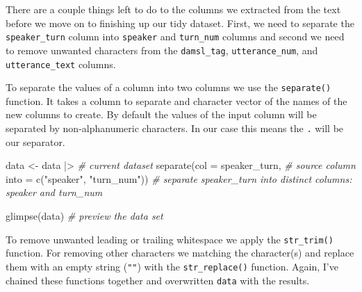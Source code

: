 \documentclass[
  letterpaper,
  DIV=11,
  numbers=noendperiod]{scrreport}
\newenvironment{Shaded}{\begin{snugshade}}{\end{snugshade}}
\newcommand{\AttributeTok}[1]{\textcolor[rgb]{0.00,0.00,0.00}{#1}}
\newcommand{\CommentTok}[1]{\textcolor[rgb]{0.00,0.00,0.00}{\textit{#1}}}
\newcommand{\FunctionTok}[1]{\textcolor[rgb]{0.00,0.00,0.00}{#1}}
\newcommand{\NormalTok}[1]{\textcolor[rgb]{0.00,0.00,0.00}{#1}}
\newcommand{\OtherTok}[1]{\textcolor[rgb]{0.00,0.00,0.00}{#1}}
\newcommand{\SpecialCharTok}[1]{\textcolor[rgb]{0.00,0.00,0.00}{#1}}
\newcommand{\StringTok}[1]{\textcolor[rgb]{0.00,0.00,0.00}{#1}}
\theoremstyle{definition}
\theoremstyle{remark}
\begin{document}
There are a couple things left to do to the columns we extracted from
the text before we move on to finishing up our tidy dataset. First, we
need to separate the \texttt{speaker\_turn} column into \texttt{speaker}
and \texttt{turn\_num} columns and second we need to remove unwanted
characters from the \texttt{damsl\_tag}, \texttt{utterance\_num}, and
\texttt{utterance\_text} columns.

To separate the values of a column into two columns we use the
\texttt{separate()} function. It takes a column to separate and
character vector of the names of the new columns to create. By default
the values of the input column will be separated by non-alphanumeric
characters. In our case this means the \texttt{.} will be our separator.

\begin{Shaded}
\begin{Highlighting}[]
\NormalTok{data }\OtherTok{\textless{}{-}}
\NormalTok{  data }\SpecialCharTok{|\textgreater{}} \CommentTok{\# current dataset}
  \FunctionTok{separate}\NormalTok{(}\AttributeTok{col =}\NormalTok{ speaker\_turn, }\CommentTok{\# source column}
           \AttributeTok{into =} \FunctionTok{c}\NormalTok{(}\StringTok{"speaker"}\NormalTok{, }\StringTok{"turn\_num"}\NormalTok{)) }\CommentTok{\# separate speaker\_turn into distinct columns: speaker and turn\_num}

\FunctionTok{glimpse}\NormalTok{(data) }\CommentTok{\# preview the data set}
\end{Highlighting}
\end{Shaded}

To remove unwanted leading or trailing whitespace we apply the
\texttt{str\_trim()} function. For removing other characters we matching
the character(s) and replace them with an empty string (\texttt{""})
with the \texttt{str\_replace()} function. Again, I've chained these
functions together and overwritten \texttt{data} with the results.
\end{document}
